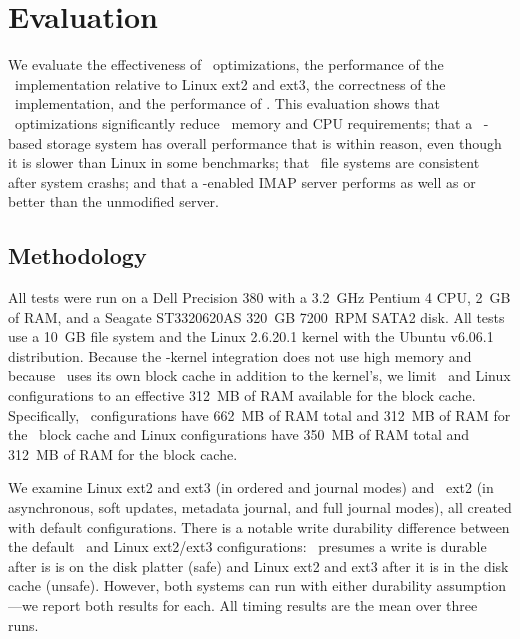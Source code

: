 
\section {Evaluation}
\label{sec:evaluation}

We evaluate
%
the effectiveness of \patch\ optimizations,
%
the performance of the \Kudos\ implementation relative to Linux ext2
and ext3,
%
the correctness of the \Kudos\ implementation,
%
and the performance of \patchgroups.
%
This evaluation shows
%
that \patch\ optimizations significantly reduce \patch\ memory and CPU
requirements;
%
that a \Kudos\ \patch-based storage system has overall performance
that is within reason, even though it is slower than Linux in some
benchmarks;
%
that \Kudos\ file systems are consistent after system crashs;
%
and that a \patchgroup-enabled IMAP server performs as well as or
better than the unmodified server.

\subsection{Methodology}

All tests were run on a Dell Precision 380 with a 3.2~GHz Pentium 4
CPU, 2~GB of RAM, and a Seagate ST3320620AS 320~GB 7200~RPM SATA2 disk.
%
All tests use a 10~GB file system and the Linux 2.6.20.1 kernel
with the Ubuntu v6.06.1 distribution.
%
Because the \Kudos-kernel integration does not use high memory and
because \Kudos\ uses its own block cache in addition to the kernel's,
we limit \Kudos\ and Linux configurations to an effective 312~MB of
RAM available for the block cache.
%
Specifically, \Kudos\ configurations have 662~MB of RAM total and
312~MB of RAM for the \Kudos\ block cache
%
and Linux configurations have 350~MB of RAM total and 312~MB of RAM
for the block cache.

We examine Linux ext2 and ext3 (in ordered and journal modes) and
\Kudos\ ext2 (in asynchronous, soft updates, metadata journal, and
full journal modes), all created with default configurations.
%
There is a notable write durability difference between the default
\Kudos\ and Linux ext2/ext3 configurations: \Kudos\ presumes a write is
durable after is is on the disk platter (safe) and Linux ext2 and ext3
after it is in the disk cache (unsafe). However, both systems can run
with either durability assumption---we report both results for each.
%
All timing results are the mean over three runs.

